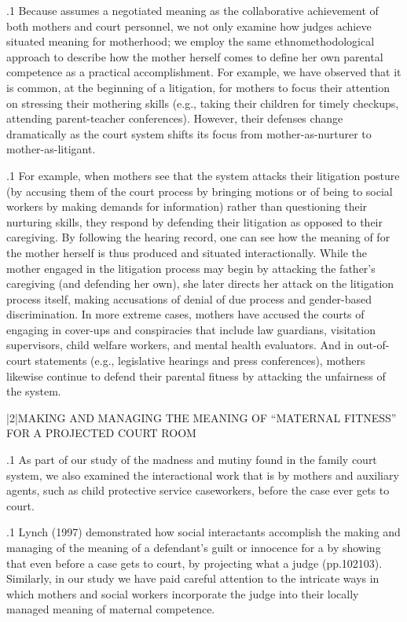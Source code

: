 \documentclass[11pt, twoside]{article}
\begin{document}
{\p.1{%
Because  assumes a negotiated meaning as the collaborative achievement of both mothers and court personnel, we not
only examine how judges achieve situated meaning for motherhood;
we employ the same ethnomethodological approach to describe how
the mother herself comes to define her own parental competence as
a practical accomplishment. For example, we have observed that it is
common, at the beginning of a litigation, for mothers to focus their attention on stressing their mothering skills (e.g., taking their children
for timely checkups, attending parent-teacher conferences). However,
their defenses change dramatically as the court system shifts its focus
from mother-as-nurturer to mother-as-litigant.
}%

\p.1{%
For example, when mothers see that the system attacks their litigation
posture (by accusing them of  the court process by bringing
 motions or of being  to social workers by making
demands for information) rather than questioning their nurturing skills,
they respond by defending their litigation as opposed to their caregiving.
By following the hearing record, one can see how the meaning of
 for the mother herself is thus produced and situated interactionally. While the mother engaged in the litigation process
may begin by attacking the father’s caregiving (and defending her own),
she later directs her attack on the litigation process itself, making accusations of denial of due process and gender-based discrimination. In
more extreme cases, mothers have accused the courts of engaging in
cover-ups and conspiracies that include law guardians, visitation supervisors, child welfare workers, and mental health evaluators. And
in out-of-court statements (e.g., legislative hearings and press conferences), mothers likewise continue to defend their parental fitness by
attacking the unfairness of the system.
}%


\s|2|{MAKING AND MANAGING THE MEANING OF ``MATERNAL FITNESS'' FOR A PROJECTED COURT ROOM}

\p.1{%
As part of our study of the madness and mutiny found in the family court
system, we also examined the interactional work that is  by mothers and auxiliary agents, such as child protective
service caseworkers, before the case ever gets to court.
}%

\p.1{%
Lynch (1997) demonstrated how social interactants accomplish the
making and managing of the meaning of a defendant’s guilt or innocence for a  by showing that even before a case
gets to court,  by projecting
what a judge  (pp.\@ 102\ndash{}103). Similarly, in our study we
have paid careful attention to the intricate ways in which mothers and
social workers incorporate the judge into their locally managed meaning
of maternal competence.
}%

}
\end{document}
